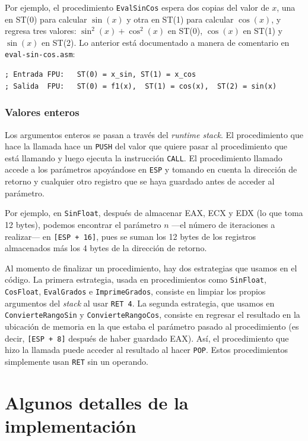 \documentclass[12pt]{article}
\begin{document}
Por ejemplo, el procedimiento \texttt{EvalSinCos} espera dos copias del valor
de $x$, una en ST(0) para calcular $\sin(x)$ y otra en ST(1) para calcular
$\cos(x)$, y regresa tres valores: $\sin^2(x) + \cos^2(x)$ en ST(0), $\cos(x)$
en ST(1) y $\sin(x)$ en ST(2). Lo anterior está documentado a manera de
comentario en \texttt{eval-sin-cos.asm}:

\begin{lstlisting}[language={[x86masm]Assembler}]
; Entrada FPU:   ST(0) = x_sin, ST(1) = x_cos
; Salida  FPU:   ST(0) = f1(x),  ST(1) = cos(x),  ST(2) = sin(x)
\end{lstlisting}

\subsubsection{Valores enteros}

Los argumentos enteros se pasan a través del \textit{runtime stack}. El
procedimiento que hace la llamada hace un \texttt{PUSH} del valor que quiere
pasar al procedimiento que está llamando y luego ejecuta la instrucción
\texttt{CALL}. El procedimiento llamado accede a los parámetros apoyándose en
\texttt{ESP} y tomando en cuenta la dirección de retorno y cualquier otro
registro que se haya guardado antes de acceder al parámetro.

Por ejemplo, en \texttt{SinFloat}, después de almacenar EAX, ECX y EDX (lo que
toma 12 bytes), podemos encontrar el parámetro $n$ ---el número de iteraciones
a realizar--- en \texttt{[ESP + 16]}, pues se suman los 12 bytes de los
registros almacenados más los 4 bytes de la dirección de retorno.

Al momento de finalizar un procedimiento, hay dos estrategias que usamos en el
código. La primera estrategia, usada en procedimientos como \texttt{SinFloat},
\texttt{CosFloat}, \texttt{EvalGrados} e \texttt{ImprimeGrados}, consiste en
limpiar los propios argumentos del \textit{stack} al usar \texttt{RET 4}. La
segunda estrategia, que usamos en \texttt{ConvierteRangoSin} y
\texttt{ConvierteRangoCos}, consiste en regresar el resultado en la ubicación
de memoria en la que estaba el parámetro pasado al procedimiento (es decir,
\texttt{[ESP + 8]} después de haber guardado EAX). Así, el procedimiento que
hizo la llamada puede acceder al resultado al hacer \texttt{POP}. Estos
procedimientos simplemente usan \texttt{RET} sin un operando.

\section{Algunos detalles de la implementación}
\end{document}
